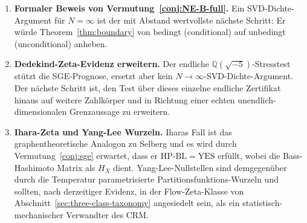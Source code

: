 \documentclass[11pt]{article}
\theoremstyle{definition}
\theoremstyle{remark}
\newcommand{\HBL}{\mathrm{HP\text{-}BL}}
\begin{document}
\begin{enumerate}
\item \textbf{Formaler Beweis von Vermutung~\ref{conj:NE-B-full}.} Ein
  SVD-Dichte-Argument für $N = \infty$ ist der mit Abstand wertvollste
  nächste Schritt: Er würde Theorem~\ref{thm:boundary} von
  bedingt (conditional) auf unbedingt (unconditional) anheben.
\item \textbf{Dedekind-Zeta-Evidenz erweitern.} Der endliche
  $\mathbb{Q}(\sqrt{-5})$-Stresstest stützt die SGE-Prognose, ersetzt
  aber kein $N\to\infty$-SVD-Dichte-Argument. Der nächste Schritt ist,
  den Test über dieses einzelne endliche Zertifikat hinaus auf weitere
  Zahlkörper und in Richtung einer echten unendlich-dimensionalen
  Grenzaussage zu erweitern.
\item \textbf{Ihara-Zeta und Yang-Lee Wurzeln.} Iharas Fall ist das
  graphentheoretische Analogon zu Selberg und es wird durch
  Vermutung~\ref{conj:sge} erwartet, dass er $\HBL = \mathrm{YES}$ erfüllt, wobei
  die Bass-Hashimoto Matrix als $H_X$ dient. Yang-Lee-Nullstellen sind demgegenüber
  durch die Temperatur parametrisierte Partitionsfunktions-Wurzeln und sollten,
  nach derzeitiger Evidenz, in der Flow-Zeta-Klasse von
  Abschnitt~\ref{sec:three-class-taxonomy} angesiedelt sein, als ein
  statistisch-mechanischer Verwandter des CRM.


\end{enumerate}
\end{document}
